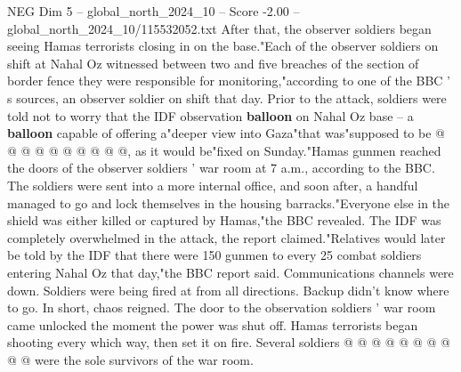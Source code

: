 \begin{textsample}{NEG Dim 5 – global\_north\_2024\_10 – Score -2.00 – global\_north\_2024\_10/115532052.txt}
After that, the observer soldiers began seeing Hamas terrorists closing in on the base."Each of the observer soldiers on shift at Nahal Oz witnessed between two and five breaches of the section of border fence they were responsible for monitoring,"according to one of the BBC ' s sources, an observer soldier on shift that day.
Prior to the attack, soldiers were told not to worry that the IDF observation \textbf{balloon} on Nahal Oz base -- a \textbf{balloon} capable of offering a"deeper view into Gaza"that was"supposed to be @ @ @ @ @ @ @ @ @ @, as it would be"fixed on Sunday."Hamas gunmen reached the doors of the observer soldiers ' war room at 7 a.m., according to the BBC.
The soldiers were sent into a more internal office, and soon after, a handful managed to go and lock themselves in the housing barracks."Everyone else in the shield was either killed or captured by Hamas,"the BBC revealed.
The IDF was completely overwhelmed in the attack, the report claimed."Relatives would later be told by the IDF that there were 150 gunmen to every 25 combat soldiers entering Nahal Oz that day,"the BBC report said.
Communications channels were down.
Soldiers were being fired at from all directions.
Backup didn't know where to go.
In short, chaos reigned.
The door to the observation soldiers ' war room came unlocked the moment the power was shut off.
Hamas terrorists began shooting every which way, then set it on fire.
Several soldiers @ @ @ @ @ @ @ @ @ @ were the sole survivors of the war room.

\end{textsample}
